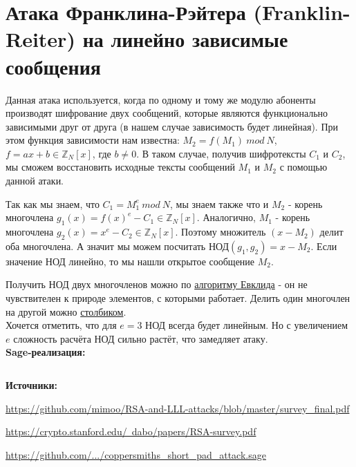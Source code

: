 \documentclass[12pt,a4paper]{scrartcl}
\begin{document}
\section{Атака Франклина-Рэйтера (Franklin-Reiter) на линейно зависимые сообщения}

Данная атака используется, когда по одному и тому же модулю абоненты производят шифрование двух сообщений, которые являются функционально зависимыми друг от друга (в нашем случае зависимость будет линейная). При этом функция зависимости нам известна: $M_2=f(M_1)\ mod\ N$, $f=ax+b \in \mathbb{Z}_N[x]$, где $b\neq 0$. В таком случае, получив шифротексты $C_1$ и $C_2$, мы сможем восстановить исходные тексты сообщений $M_1$ и $M_2$ с помощью данной атаки.

Так как мы знаем, что $C_1 = M_1^e\ mod\ N$, мы знаем также что и $M_2$ - корень многочлена $g_1(x) = f(x)^e - C_1 \in \mathbb{Z}_N[x]$. Аналогично,  $M_1$ - корень многочлена $g_2(x) = x^e - C_2 \in \mathbb{Z}_N[x]$. Поэтому множитель $(x-M_2)$ делит оба многочлена. А значит мы можем посчитать НОД$(g_1,g_2)=x-M_2$. Если значение НОД линейно, то мы нашли открытое сообщение $M_2$.

Получить НОД двух многочленов можно по \href{https://yatb.kksctf.ru/}{алгоритму Евклида} - он не чувствителен к природе элементов, с которыми работает. Делить один многочлен на другой можно \href{https://yatb.kksctf.ru/}{столбиком}.\\

Хочется отметить, что для $e=3$  НОД всегда будет линейным. Но с увеличением $e$ сложность расчёта НОД сильно растёт, что замедляет атаку.\\

\textbf{Sage-реализация:}

\inputminted[tabsize=4,obeytabs,fontsize=\footnotesize]{python3}{./RSA_scripts/franclin-reiter.sage}

\textbf{Источники:}

\href{https://github.com/mimoo/RSA-and-LLL-attacks/blob/master/survey_final.pdf}{https://github.com/mimoo/RSA-and-LLL-attacks/blob/master/survey\_final.pdf}

\href{https://crypto.stanford.edu/~dabo/papers/RSA-survey.pdf}{https://crypto.stanford.edu/~dabo/papers/RSA-survey.pdf}

\href{https://github.com/yud121212/Coppersmith-s-Short-Pad-Attack-Franklin-Reiter-Related-Message-Attack/blob/master/coppersmiths_short_pad_attack.sage}{https://github.com/.../coppersmiths\_short\_pad\_attack.sage}
\end{document}
